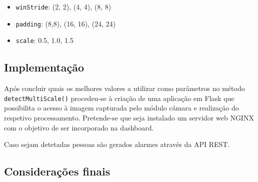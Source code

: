 \begin{itemize}
	\item \texttt{winStride}: (2, 2), (4, 4), (8, 8)
	
	\item \texttt{padding}: (8,8), (16, 16), (24, 24)
	
	\item \texttt{scale}: 0.5, 1.0, 1.5 
\end{itemize}


\subsection{Implementação}


Após concluir quais os melhores valores a utilizar como parâmetros no método \linebreak \texttt{detectMultiScale()}  procedeu-se à criação de uma aplicação em Flask que possibilita o acesso à imagem capturada pelo módulo câmara e realização do respetivo processamento. Pretende-se que seja instalado um servidor web NGINX com o objetivo de ser incorporado na dashboard. 


Caso sejam detetadas pessoas são gerados alarmes através da \ac{API} \ac{REST}. 



\subsection{Considerações finais}





